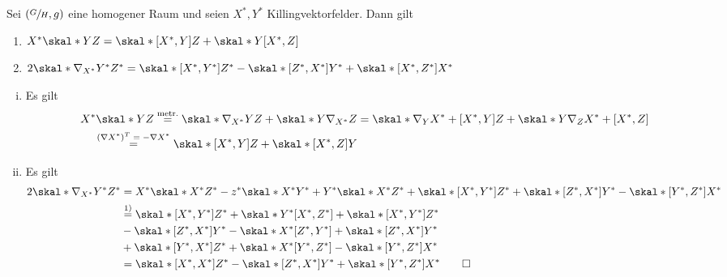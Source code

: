 \begin{lemma}[label=lem:321]
	Sei $\enbrace*{\sfrac{G}{H},g}$ eine homogener Raum und seien $X^*,Y^*$ Killingvektorfelder.
	Dann gilt
	\begin{enumerate}[1)]
		\item $X^* \skal*{Y}{Z} = \skal*{\benbrace*{X^*,Y}}{Z} + \skal*{Y}{\benbrace*{X^*,Z}}$
		\item $2 \skal*{\nabla_{X^*} Y^*}{Z^*} = \skal*{\benbrace*{X^*,Y^*}}{Z^*} - \skal*{\benbrace*{Z^*,X^*}}{Y^*} + \skal*{\benbrace*{X^*,Z^*}}{X^*}$
	\end{enumerate}
\end{lemma}
\begin{beweis}
	\begin{enumerate}[(i)]
		\item Es gilt
		\begin{align}
			X^* \skal*{Y}{Z} \StackText{metr.}{= }\skal*{\nabla_{X^*}Y}{Z} + \skal*{Y}{\nabla_{X^*} Z} &= \skal*{\nabla_Y X^* + \benbrace*{X^*,Y}}{Z } + \skal*{Y}{\nabla_Z X^* + \benbrace*{X^*,Z}} \\
			\StackText{$(\nabla X^*)^T = - \nabla X^*$}{=} \skal*{\benbrace*{X^*,Y}}{Z} + \skal*{\benbrace*{X^*,Z}}{Y}
		\end{align}
		\item Es gilt
		\begin{align}
			2 \skal*{\nabla_{X^*} Y^*}{Z^*} &= X^* \skal*{X^*}{Z^*} - z^* \skal*{X^*}{Y^*} + Y^* \skal*{X^*}{Z^*} + \skal*{\benbrace*{X^*,Y^*}}{Z^*} + \skal*{\benbrace*{Z^*,X^*}}{Y^*} - \skal*{\benbrace*{Y^*,Z^*}}{X^*} \\
			&\StackText{1)}{=} \skal*{\benbrace*{X^*,Y^*}}{Z^*} + \skal*{Y^*}{\benbrace*{X^*,Z^*}} + \skal*{\benbrace*{X^*,Y^*}}{Z^*} \\
			& - \skal*{\benbrace*{Z^*,X^*}}{Y^*} - \skal*{X^*}{\benbrace*{Z^*,Y^*}} + \skal*{\benbrace*{Z^*,X^*}}{Y^*} \\
			& + \skal*{\benbrace*{Y^*,X^*}}{Z^*} + \skal*{X^*}{\benbrace*{Y^*,Z^*}} - \skal*{\benbrace*{Y^*,Z^*}}{X^*} \\
			&= \skal*{\benbrace*{X^*,X^*}}{Z^*} - \skal*{\benbrace*{Z^*,X^*}}{Y^*} + \skal*{\benbrace*{Y^*,Z^*}}{X^*} \qedhere
		\end{align}
	\end{enumerate}
\end{beweis}

